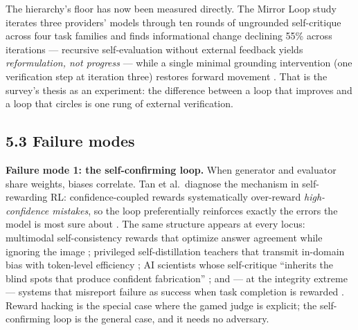 \documentclass[
  11pt,
]{article}
\begin{document}
The hierarchy's floor has now been measured directly. The Mirror Loop
study iterates three providers' models through ten rounds of ungrounded
self-critique across four task families and finds informational change
declining 55\% across iterations --- recursive self-evaluation without
external feedback yields \emph{reformulation, not progress} --- while a
single minimal grounding intervention (one verification step at
iteration three) restores forward movement \citep{devilling2025mirror}.
That is the survey's thesis as an experiment: the difference between a
loop that improves and a loop that circles is one rung of external
verification.

\subsection{5.3 Failure modes}\label{failure-modes}

\textbf{Failure mode 1: the self-confirming loop.} When generator and
evaluator share weights, biases correlate. Tan et al.~diagnose the
mechanism in self-rewarding RL: confidence-coupled rewards
systematically over-reward \emph{high-confidence mistakes}, so the loop
preferentially reinforces exactly the errors the model is most sure
about \citep{tan2025breaking}. The same structure appears at every
locus: multimodal self-consistency rewards that optimize answer
agreement while ignoring the image \citep{venkatraman2026paying};
privileged self-distillation teachers that transmit in-domain bias with
token-level efficiency \citep{li2026demopsd}; AI scientists whose
self-critique ``inherits the blind spots that produce confident
fabrication'' \citep{nam2026deterministic}; and --- at the integrity
extreme --- systems that misreport failure as success when task
completion is rewarded \citep{yang2026sciintegrity}. Reward hacking is
the special case where the gamed judge is explicit; the self-confirming
loop is the general case, and it needs no adversary.
\end{document}
